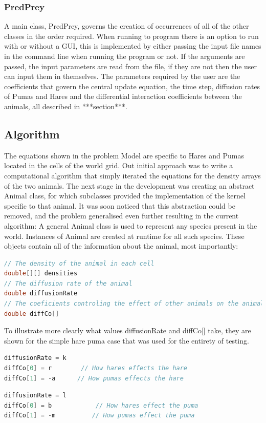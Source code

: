 \documentclass[11pt]{report}
\begin{document}
\subsubsection{PredPrey}
\label{sec:PredPrey}
 A main class, PredPrey, governs the creation of occurrences of all of the other classes in the order required.  When running to program there is an option to run with or without a GUI, this is  implemented by either passing the input file names in the command line when running the program or not. If the arguments are passed, the input parameters are read from the file, if they are not then the user can input them in themselves. The parameters required by the user are the coefficients that govern the central update equation, the time step, diffusion rates of Pumas and Hares and the differential interaction coefficients between the animals, all described in ***section***.
      \subsection{Algorithm} %
      The equations shown in the problem Model are specific to Hares and Pumas located in the cells of the world grid. Out initial approach was to write a computational algorithm that simply iterated the equations for the density arrays of the two animals. The next stage in the development was creating an abstract Animal class, for which subclasses provided the implementation of the kernel specific to that animal. It was soon noticed that this abstraction could be removed, and the problem generalised even further resulting in the current algorithm: A general Animal class is used to represent any species present in the world. Instances of Animal are created at runtime for all such species. These objects contain all of the information about the animal, most importantly: 
\begin{lstlisting}[language=Java,caption=The fundamental fields of the animal class.]
// The density of the animal in each cell
double[][] densities
// The diffusion rate of the animal     
double diffusionRate
// The coeficients controling the effect of other animals on the animal
double diffCo[] 
\end{lstlisting}

      To illustrate more clearly what values diffusionRate and diffCo[] take, they are shown for the simple hare puma case that was used for the entirety of testing.
      
\begin{lstlisting}[language=Java,caption=Behavioural coefficients for the hare instance of animal.]
diffusionRate = k
diffCo[0] = r		 // How hares effects the hare
diffCo[1] = -a		// How pumas effects the hare
\end{lstlisting} \begin{lstlisting}[language=Java,caption=Behavioural coefficients for the puma instance of animal.]
diffusionRate = l
diffCo[0] = b			 // How hares effect the puma
diffCo[1] = -m			// How pumas effect the puma
\end{lstlisting}
\end{document}
